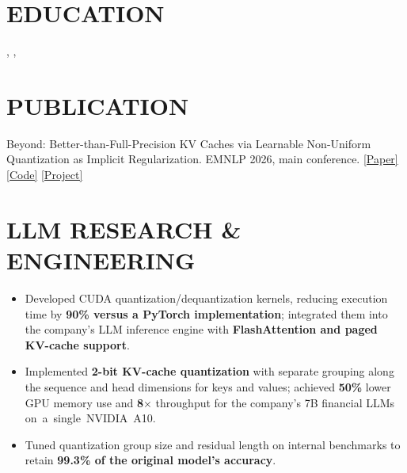 \documentclass[letterpaper,10pt]{article}
\begin{document}
\fontsize{10.3}{12.5}\selectfont


\section{EDUCATION}
\sep
{}
\sep
{}

\section{PUBLICATION}
{Beyond: Better-than-Full-Precision KV Caches via Learnable Non-Uniform Quantization as Implicit Regularization.}
{EMNLP 2026, main conference.}
{\href{https://wsxhjnb1.github.io/Beyond-KV-Cache/paper/Beyond.pdf}{\textcolor{accent}{[Paper]}}
\enspace\href{https://github.com/wsxhjnb1/Beyond-KV-Cache}{\textcolor{accent}{[Code]}}
\enspace\href{https://wsxhjnb1.github.io/Beyond-KV-Cache/}{\textcolor{accent}{[Project]}}}

\section{LLM RESEARCH \& ENGINEERING}
\begin{itemize}
  \item Developed CUDA quantization/dequantization kernels, reducing execution time by \textbf{90\% versus a PyTorch implementation}; integrated them into the company's LLM inference engine with \textbf{FlashAttention and paged KV-cache support}.
  \item Implemented \textbf{2-bit KV-cache quantization} with separate grouping along the sequence and head dimensions for keys and values; achieved \textbf{50\%} lower GPU memory use and \textbf{8$\times$} throughput for the company's 7B financial LLMs \mbox{on a single NVIDIA A10}.
  \item Tuned quantization group size and residual length on internal benchmarks to retain \textbf{99.3\% of the original model's accuracy}.
\end{itemize}
\end{document}
